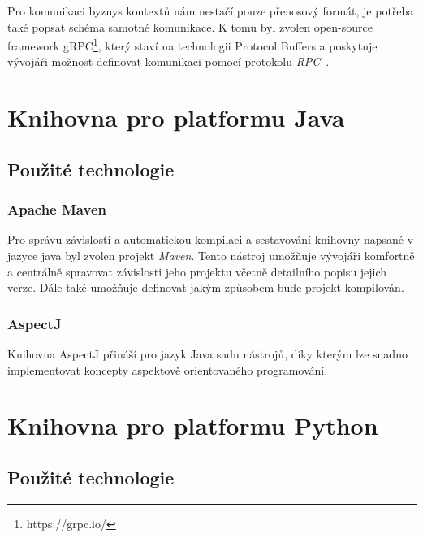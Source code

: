 Pro komunikaci byznys kontextů nám nestačí pouze přenosový formát,
je potřeba také popsat schéma samotné komunikace. K tomu byl zvolen
open-source framework gRPC\footnote{
https://grpc.io/
}, který staví na technologii Protocol Buffers a poskytuje vývojáři
možnost definovat komunikaci pomocí protokolu \textit{RPC}~\cite{nelson1981remote}.



\section{Knihovna pro platformu Java}

\subsection{Použité technologie}

\subsubsection{Apache Maven}

Pro správu závislostí a automatickou kompilaci a sestavování
knihovny napsané v jazyce java byl zvolen projekt \textit{Maven}. %
Tento nástroj umožňuje vývojáři komfortně a centrálně
spravovat závislosti jeho projektu včetně detailního
popisu jejich verze. Dále také umožňuje definovat jakým
způsobem bude projekt kompilován.

\subsubsection{AspectJ}

Knihovna AspectJ přináší pro jazyk Java sadu nástrojů,
díky kterým lze snadno implementovat koncepty aspektově orientovaného
programování.


\section{Knihovna pro platformu Python}

\subsection{Použité technologie}

